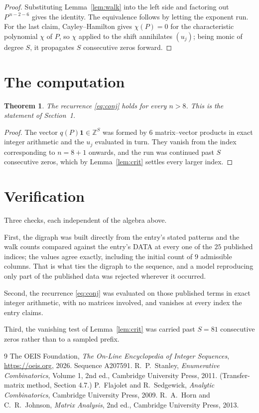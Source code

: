 \documentclass[11pt,a4paper]{article}
\theoremstyle{plain}
\newtheorem{theorem}{Theorem}
\theoremstyle{definition}
\begin{document}
\begin{proof}
Substituting Lemma~\ref{lem:walk} into the left side and factoring out
$P^{\,n-2-6}$ gives the identity. The equivalence follows by letting the exponent
run. For the last claim, Cayley--Hamilton gives $\chi(P)=0$ for the characteristic
polynomial $\chi$ of $P$, so $\chi$ applied to the shift annihilates $(u_j)$; being monic of
degree $S$, it propagates $S$ consecutive zeros forward.
\end{proof}

\section{The computation}

\begin{theorem}
The recurrence \eqref{eq:conj} holds for every $n>8$. This is the statement of
Section~1.
\end{theorem}

\begin{proof}
The vector $q(P)\mathbf{1}\in\mathbb{Z}^{S}$ was formed by $6$ matrix--vector
products in exact integer arithmetic and the $u_j$ evaluated in turn. They vanish from the
index corresponding to $n=8+1$ onwards, and the run was continued past $S$ consecutive
zeros, which by Lemma~\ref{lem:crit} settles every larger index.
\end{proof}

\section{Verification}

Three checks, each independent of the algebra above.

First, the digraph was built directly from the entry's stated patterns and the walk counts
compared against the entry's DATA at every one of the $25$ published indices; the
values agree exactly, including the initial count of $9$ admissible columns. That is
what ties the digraph to the sequence, and a model reproducing only part of the published
data was rejected wherever it occurred.

Second, the recurrence \eqref{eq:conj} was evaluated on those published terms in exact
integer arithmetic, with no matrices involved, and vanishes at every index the entry claims.

Third, the vanishing test of Lemma~\ref{lem:crit} was carried past $S=81$ consecutive
zeros rather than to a sampled prefix.

\begin{thebibliography}{9}
 The OEIS Foundation, \emph{The On-Line Encyclopedia of Integer
Sequences}, \url{https://oeis.org}, 2026. Sequence A207591.
 R.~P.~Stanley, \emph{Enumerative Combinatorics}, Volume 1, 2nd ed.,
Cambridge University Press, 2011. (Transfer-matrix method, Section 4.7.)
 P.~Flajolet and R.~Sedgewick, \emph{Analytic Combinatorics}, Cambridge
University Press, 2009.
 R.~A.~Horn and C.~R.~Johnson, \emph{Matrix Analysis}, 2nd ed., Cambridge
University Press, 2013.
\end{thebibliography}
\end{document}
